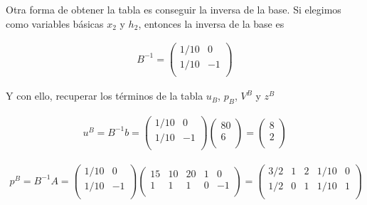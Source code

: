 \begin{enumerate}
    
    Otra forma de obtener la tabla es conseguir la inversa de la base. Si elegimos como variables básicas $x_2$ y $h_2$, entonces la inversa de la base es

    \begin{equation}
    \begin{split}
    B^{-1} =\begin{pmatrix}
    1/10 & 0\\
    1/10 & -1\\
    \end{pmatrix}
    \end{split}
    \end{equation}

    Y con ello, recuperar los términos de la tabla $u_B$, $p_B$, $V^B$ y $z^B$

    \begin{equation}
\begin{split}
u^B=B^{-1}b = \begin{pmatrix}
1/10 & 0\\
1/10 & -1\\
\end{pmatrix}
\begin{pmatrix}
80\\
6\\
\end{pmatrix}
 = \begin{pmatrix}
8\\
2\\
\end{pmatrix}
\end{split}
\end{equation}

\begin{equation}
\begin{split}
p^B = B^{-1}A = \begin{pmatrix}
1/10 & 0\\
1/10 & -1\\
\end{pmatrix}
\begin{pmatrix}
15 & 10 & 20 & 1 & 0\\
1 & 1 & 1 & 0 & -1\\
\end{pmatrix}
 = \begin{pmatrix}
3/2 & 1 & 2 & 1/10 & 0\\
1/2 & 0 & 1 & 1/10 & 1\\
\end{pmatrix}
\end{split}
\end{equation}


\end{enumerate}
